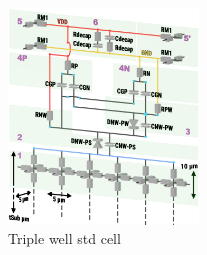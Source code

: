 
\begin{figure}[h]
	\label{triplewellstdcell}
	\center
	\includegraphics[width=0.45\textwidth]{./figures/tripleWell_no_7c_Eevee_LR.png}
	\caption{Triple well std cell}
\end{figure}
